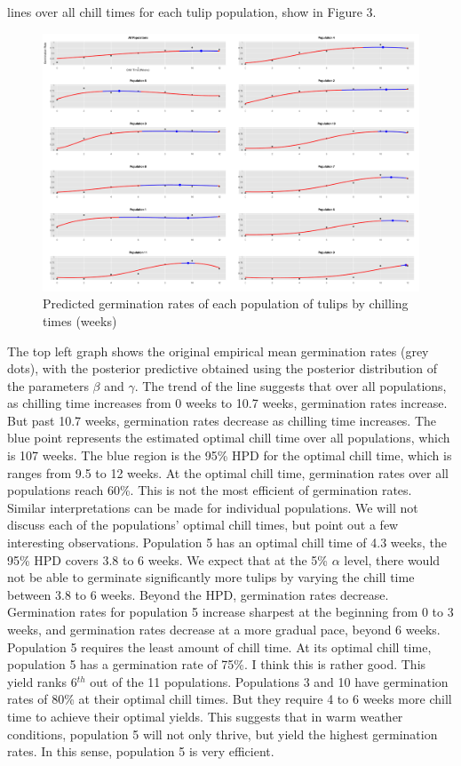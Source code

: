 \documentclass[mathserif]{article}
\def\beginmyfig{\begin{figure}[htbp]\begin{center}}
\def\endmyfig{\end{center}\end{figure}}
\begin{document}
lines over all chill times for each tulip population, show in Figure 3.
\beginmyfig
  \includegraphics[scale=.35]{../../images/chilleffect.pdf}
  \vspace{-2mm}
  \caption{Predicted germination rates of each population of tulips by
           chilling times (weeks)}
\endmyfig
The top left graph shows the original empirical mean germination rates (grey
dots), with the posterior predictive obtained using the posterior distribution
of the parameters $\beta$ and $\gamma$. The trend of the line suggests that
over all populations, as chilling time increases from 0 weeks to 10.7 weeks,
germination rates increase. But past 10.7 weeks, germination rates decrease as
chilling time increases. The blue point represents the estimated optimal chill
time over all populations, which is 107 weeks. The blue region is the 95\% HPD
for the optimal chill time, which is ranges from 9.5 to 12 weeks. At the
optimal chill time, germination rates over all populations reach 60\%. This is
not the most efficient of germination rates.\\

\noindent
Similar interpretations can be made for individual populations. We will not
discuss each of the populations' optimal chill times, but point out a few
interesting observations. Population 5 has an optimal chill time of 4.3 weeks,
the 95\% HPD covers 3.8 to 6 weeks. We expect that at the 5\% $\alpha$ level,
there would not be able to germinate significantly more tulips by varying the
chill time between 3.8 to 6 weeks. Beyond the HPD, germination rates decrease.
Germination rates for population 5 increase sharpest at the beginning from 0 to
3 weeks, and germination rates decrease at a more gradual pace, beyond 6 weeks.
Population 5 requires the least amount of chill time. At its optimal chill
time, population 5 has a germination rate of 75\%. I think this is rather good.
This yield ranks 6$^{th}$ out of the 11 populations. Populations 3 and 10 have
germination rates of 80\% at their optimal chill times. But they require 4 to 6
weeks more chill time to achieve their optimal yields. This suggests that
in warm weather conditions, population 5 will not only thrive, but yield the
highest germination rates. In this sense, population 5 is very efficient.\\
\end{document}
